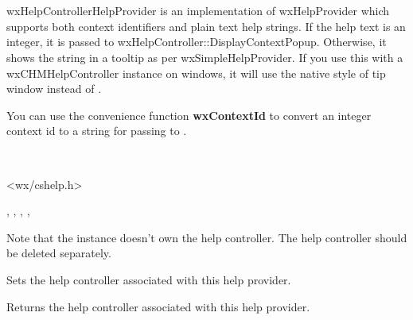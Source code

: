 \section{}\label{wxhelpcontrollerhelpprovider}

wxHelpControllerHelpProvider is an implementation of wxHelpProvider which supports
both context identifiers and plain text help strings. If the help text is an integer,
it is passed to wxHelpController::DisplayContextPopup. Otherwise, it shows the string
in a tooltip as per wxSimpleHelpProvider. If you use this with a wxCHMHelpController instance
on windows, it will use the native style of tip window instead of .

You can use the convenience function {\bf wxContextId} to convert an integer context
id to a string for passing to .


\\


<wx/cshelp.h>




, , 
, , 


\label{wxhelpcontrollerhelpproviderwxhelpcontrollerhelpprovider}


Note that the instance doesn't own the help controller. The help controller
should be deleted separately.

\label{wxhelpcontrollerhelpprovidersethelpcontroller}


Sets the help controller associated with this help provider.

\label{wxhelpcontrollerhelpprovidergethelpcontroller}


Returns the help controller associated with this help provider.

